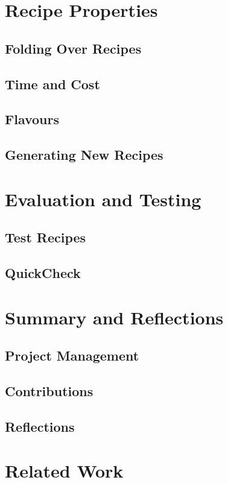 \documentclass[11pt]{article}
\begin{document}
    \section{Recipe Properties}
        \subsection{Folding Over Recipes}
        \subsection{Time and Cost}
        \subsection{Flavours}
        \subsection{Generating New Recipes}

    \section{Evaluation and Testing}
        \subsection{Test Recipes}
        \subsection{QuickCheck}

    \section{Summary and Reflections}
        \subsection{Project Management}
        \subsection{Contributions}
        \subsection{Reflections}

    \section{Related Work}
\end{document}
